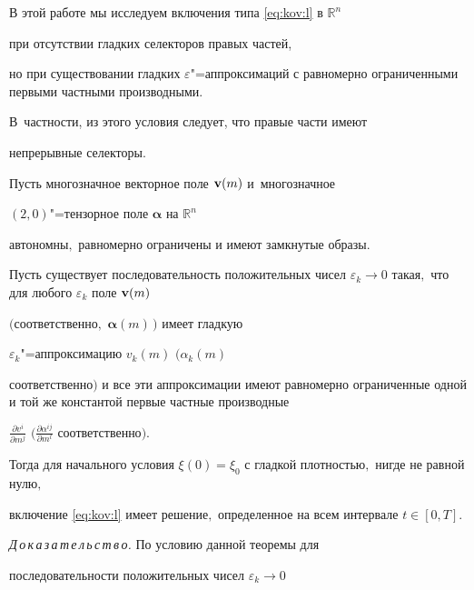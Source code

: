 \smallskip 





 В этой работе мы исследуем включения типа \eqref{eq:kov:l} в $\mathbb{R}^n$

 при отсутствии гладких селекторов правых частей,

 но при существовании гладких $\varepsilon$"=аппроксимаций с равномерно ограниченными первыми частными производными.

 В~частности, из этого условия следует, что правые части имеют

непрерывные селекторы.



\smallskip



\begin{theorem}\label{eq:kov:13.6}Пусть многозначное векторное поле ${\bf v}(m)$  и~многозначное

$(2,0)$"=тензорное поле $\boldsymbol\alpha$ на $\mathbb{R}^n$

автономны$,$ равномерно ограничены и имеют замкнутые образы$.$ 

Пусть существует последовательность положительных чисел $\varepsilon_k\to

0$ такая$,$ что для любого $\varepsilon_k$ поле ${\bf v}(m)$

$($соответственно$,$ ${\boldsymbol\alpha}(m)\,)$ имеет гладкую

$\varepsilon_k$"=аппроксимацию $v_k(m)$ $(\alpha_k(m)$

соответственно$)$ и все эти аппроксимации имеют равномерно ограниченные одной и той же константой первые частные производные

$\frac{\partial v^i}{\partial m^j}$ $\bigl({\frac {\partial

\alpha^{ij}}{\partial m^l}}$ соответственно$\bigr).$ 

Тогда для начального условия $\xi(0)=\xi_0$ с гладкой плотностью$,$ нигде не равной ну\-лю$,$

включение \eqref{eq:kov:l}  имеет решение$,$ определенное на всем интервале $t\in [0, T].$

\end{theorem}



\smallskip



{\it Д\,о\,к\,а\,з\,а\,т\,е\,л\,ь\,с\,т\,в\,о.\/} По условию данной теоремы для

последовательности  положительных  чисел $\varepsilon_k\to 0$

